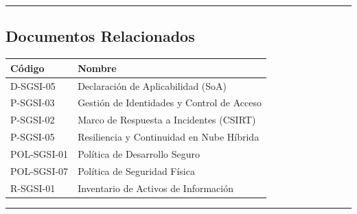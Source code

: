 \documentclass[10pt,letterpaper]{article}
\begin{document}
\begin{center}\rule{0.5\linewidth}{0.5pt}\end{center}

\subsection{Documentos Relacionados}\label{documentos-relacionados}

{\setlength{\RaggedRightRightskip}{0pt plus 5em}\small\sloppy \begin{longtable}[]{@{}ll@{}}
\toprule\noalign{}
Código & Nombre \\
\midrule\noalign{}
\endhead
\bottomrule\noalign{}
\endlastfoot
D-SGSI-05 & Declaración de Aplicabilidad (SoA) \\
P-SGSI-03 & Gestión de Identidades y Control de Acceso \\
P-SGSI-02 & Marco de Respuesta a Incidentes (CSIRT) \\
P-SGSI-05 & Resiliencia y Continuidad en Nube Híbrida \\
POL-SGSI-01 & Política de Desarrollo Seguro \\
POL-SGSI-07 & Política de Seguridad Física \\
R-SGSI-01 & Inventario de Activos de Información \\
\end{longtable}\normalsize}

\begin{center}\rule{0.5\linewidth}{0.5pt}\end{center}
\end{document}
